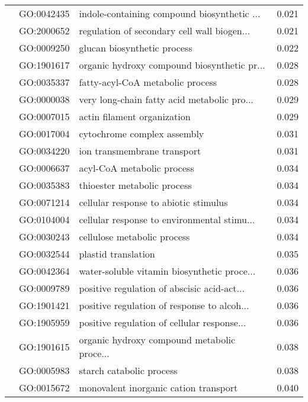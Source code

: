 \begin{longtable}{lllr}
   & GO:0042435 &  indole-containing compound biosynthetic ... &         0.021 \\
   & GO:2000652 &  regulation of secondary cell wall biogen... &         0.021 \\
   & GO:0009250 &                  glucan biosynthetic process &         0.022 \\
   & GO:1901617 &  organic hydroxy compound biosynthetic pr... &         0.028 \\
   & GO:0035337 &             fatty-acyl-CoA metabolic process &         0.028 \\
   & GO:0000038 &  very long-chain fatty acid metabolic pro... &         0.029 \\
   & GO:0007015 &                  actin filament organization &         0.029 \\
   & GO:0017004 &                  cytochrome complex assembly &         0.031 \\
   & GO:0034220 &                  ion transmembrane transport &         0.031 \\
   & GO:0006637 &                   acyl-CoA metabolic process &         0.034 \\
   & GO:0035383 &                  thioester metabolic process &         0.034 \\
   & GO:0071214 &        cellular response to abiotic stimulus &         0.034 \\
   & GO:0104004 &  cellular response to environmental stimu... &         0.034 \\
   & GO:0030243 &                  cellulose metabolic process &         0.034 \\
   & GO:0032544 &                          plastid translation &         0.035 \\
   & GO:0042364 &  water-soluble vitamin biosynthetic proce... &         0.036 \\
   & GO:0009789 &  positive regulation of abscisic acid-act... &         0.036 \\
   & GO:1901421 &  positive regulation of response to alcoh... &         0.036 \\
   & GO:1905959 &  positive regulation of cellular response... &         0.036 \\
   & GO:1901615 &  organic hydroxy compound metabolic proce... &         0.038 \\
   & GO:0005983 &                     starch catabolic process &         0.038 \\
   & GO:0015672 &        monovalent inorganic cation transport &         0.040 \\

\end{longtable}
